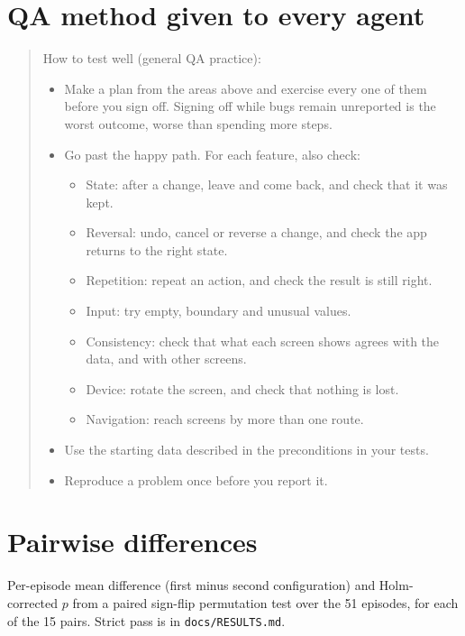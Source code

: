 \documentclass[11pt]{article}
\begin{document}
\section{QA method given to every agent}\label{app:method}
\begin{quote}\small
How to test well (general QA practice):
\begin{itemize}
  \item Make a plan from the areas above and exercise every one of them before you sign off.
    Signing off while bugs remain unreported is the worst outcome, worse than spending more steps.
  \item Go past the happy path. For each feature, also check:
  \begin{itemize}
    \item State: after a change, leave and come back, and check that it was kept.
    \item Reversal: undo, cancel or reverse a change, and check the app returns to the right state.
    \item Repetition: repeat an action, and check the result is still right.
    \item Input: try empty, boundary and unusual values.
    \item Consistency: check that what each screen shows agrees with the data, and with other screens.
    \item Device: rotate the screen, and check that nothing is lost.
    \item Navigation: reach screens by more than one route.
  \end{itemize}
  \item Use the starting data described in the preconditions in your tests.
  \item Reproduce a problem once before you report it.
\end{itemize}
\end{quote}

\section{Pairwise differences}\label{app:pairwise}
Per-episode mean difference (first minus second configuration) and Holm-corrected $p$ from a paired
sign-flip permutation test over the 51 episodes, for each of the 15 pairs. Strict pass is in
\texttt{docs/RESULTS.md}.
\begin{table}[h]
\centering\small

\end{table}
\end{document}
